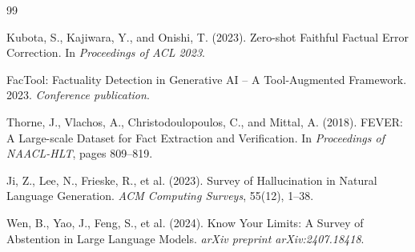 \documentclass[12pt,a4paper,openright]{report}
\begin{document}
\begin{thebibliography}{99}

Kubota, S., Kajiwara, Y., and Onishi, T. (2023).
Zero-shot Faithful Factual Error Correction.
In \textit{Proceedings of ACL 2023}.

FacTool: Factuality Detection in Generative AI -- A Tool-Augmented Framework.
2023.
\textit{Conference publication}.

Thorne, J., Vlachos, A., Christodoulopoulos, C., and Mittal, A. (2018).
FEVER: A Large-scale Dataset for Fact Extraction and Verification.
In \textit{Proceedings of NAACL-HLT}, pages 809--819.

Ji, Z., Lee, N., Frieske, R., et al. (2023).
Survey of Hallucination in Natural Language Generation.
\textit{ACM Computing Surveys}, 55(12), 1--38.

Wen, B., Yao, J., Feng, S., et al. (2024).
Know Your Limits: A Survey of Abstention in Large Language Models.
\textit{arXiv preprint arXiv:2407.18418}.

\end{thebibliography}
\end{document}
